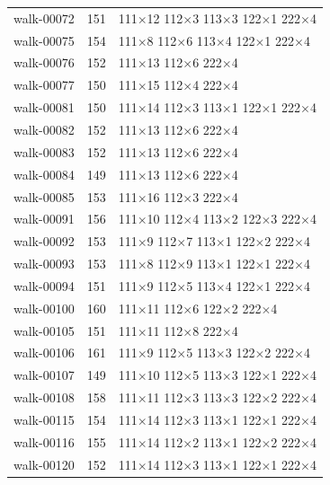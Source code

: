 \documentclass[10pt]{article}
\begin{document}
{\begin{longtable}{@{}l r l@{}}
walk-00072 & 151 & 111\(\times\)12 112\(\times\)3 113\(\times\)3 122\(\times\)1 222\(\times\)4 \\
walk-00075 & 154 & 111\(\times\)8 112\(\times\)6 113\(\times\)4 122\(\times\)1 222\(\times\)4 \\
walk-00076 & 152 & 111\(\times\)13 112\(\times\)6 222\(\times\)4 \\
walk-00077 & 150 & 111\(\times\)15 112\(\times\)4 222\(\times\)4 \\
walk-00081 & 150 & 111\(\times\)14 112\(\times\)3 113\(\times\)1 122\(\times\)1 222\(\times\)4 \\
walk-00082 & 152 & 111\(\times\)13 112\(\times\)6 222\(\times\)4 \\
walk-00083 & 152 & 111\(\times\)13 112\(\times\)6 222\(\times\)4 \\
walk-00084 & 149 & 111\(\times\)13 112\(\times\)6 222\(\times\)4 \\
walk-00085 & 153 & 111\(\times\)16 112\(\times\)3 222\(\times\)4 \\
walk-00091 & 156 & 111\(\times\)10 112\(\times\)4 113\(\times\)2 122\(\times\)3 222\(\times\)4 \\
walk-00092 & 153 & 111\(\times\)9 112\(\times\)7 113\(\times\)1 122\(\times\)2 222\(\times\)4 \\
walk-00093 & 153 & 111\(\times\)8 112\(\times\)9 113\(\times\)1 122\(\times\)1 222\(\times\)4 \\
walk-00094 & 151 & 111\(\times\)9 112\(\times\)5 113\(\times\)4 122\(\times\)1 222\(\times\)4 \\
walk-00100 & 160 & 111\(\times\)11 112\(\times\)6 122\(\times\)2 222\(\times\)4 \\
walk-00105 & 151 & 111\(\times\)11 112\(\times\)8 222\(\times\)4 \\
walk-00106 & 161 & 111\(\times\)9 112\(\times\)5 113\(\times\)3 122\(\times\)2 222\(\times\)4 \\
walk-00107 & 149 & 111\(\times\)10 112\(\times\)5 113\(\times\)3 122\(\times\)1 222\(\times\)4 \\
walk-00108 & 158 & 111\(\times\)11 112\(\times\)3 113\(\times\)3 122\(\times\)2 222\(\times\)4 \\
walk-00115 & 154 & 111\(\times\)14 112\(\times\)3 113\(\times\)1 122\(\times\)1 222\(\times\)4 \\
walk-00116 & 155 & 111\(\times\)14 112\(\times\)2 113\(\times\)1 122\(\times\)2 222\(\times\)4 \\
walk-00120 & 152 & 111\(\times\)14 112\(\times\)3 113\(\times\)1 122\(\times\)1 222\(\times\)4 \\

\end{longtable}}
\end{document}
